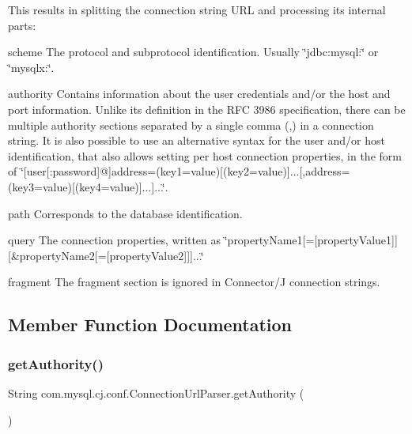 This results in splitting the connection string U\+RL and processing its internal parts\+: 
\begin{DoxyDescription}
\item[scheme ]The protocol and subprotocol identification. Usually \char`\"{}jdbc\+:mysql\+:\char`\"{} or \char`\"{}mysqlx\+:\char`\"{}. 
\item[authority ]Contains information about the user credentials and/or the host and port information. Unlike its definition in the R\+FC 3986 specification, there can be multiple authority sections separated by a single comma (,) in a connection string. It is also possible to use an alternative syntax for the user and/or host identification, that also allows setting per host connection properties, in the form of \char`\"{}\mbox{[}user\mbox{[}\+:password\mbox{]}@\mbox{]}address=(key1=value)\mbox{[}(key2=value)\mbox{]}...\mbox{[},address=(key3=value)\mbox{[}(key4=value)\mbox{]}...\mbox{]}...\char`\"{}. 
\item[path ]Corresponds to the database identification. 
\item[query ]The connection properties, written as \char`\"{}property\+Name1\mbox{[}=\mbox{[}property\+Value1\mbox{]}\mbox{]}\mbox{[}\&property\+Name2\mbox{[}=\mbox{[}property\+Value2\mbox{]}\mbox{]}\mbox{]}...\char`\"{} 
\item[fragment ]The fragment section is ignored in Connector/J connection strings. 
\end{DoxyDescription}

\subsection{Member Function Documentation}
\mbox{\label{classcom_1_1mysql_1_1cj_1_1conf_1_1_connection_url_parser_afc563e2c255dbf29c24fd6f71d0b8122}} 
\subsubsection{\texorpdfstring{get\+Authority()}{getAuthority()}}
{\footnotesize\ttfamily String com.\+mysql.\+cj.\+conf.\+Connection\+Url\+Parser.\+get\+Authority (\begin{DoxyParamCaption}{ }\end{DoxyParamCaption})}

